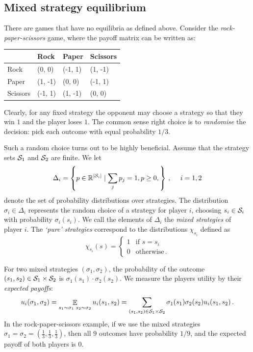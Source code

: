 \documentclass[12pt, showidx, twoside]{article}
\begin{document}
{{{\subsection{Mixed strategy equilibrium}
There are games that have no equilibria as defined above. Consider the \emph{rock-paper-scissors} game, where the payoff matrix can be written as:
\begin{center}
\begin{tabular}{l|l|l|l|}
 & Rock & Paper & Scissors\\ \hline
Rock & (\phantom{-}0, \phantom{-}0) & (-1, \phantom{-}1) & (\phantom{-}1, -1)\\ \hline
Paper & (\phantom{-}1, -1) & (\phantom{-}0, \phantom{-}0) & (-1, \phantom{-}1)\\ \hline
Scissors & (-1, \phantom{-}1) & (\phantom{-}1, -1) & (\phantom{-}0, \phantom{-}0)\\
\hline
\end{tabular}
\end{center}
Clearly, for any fixed strategy the opponent may choose a strategy so that they win $1$ and the player loses $1$. The common sense right choice is to \emph{randomise} the decision: pick each outcome with equal probability $1/3$.

Such a random choice turns out to be highly beneficial. Assume that the strategy sets ${\cal S}_1$ and ${\cal S}_2$ are finite. We let 
\[
    \Delta_i=\left\{p\in \mathbb{R}^{|{\cal S}_i|}\mid \sum_{j} p_j=1, p\ge 0,\right\}\, , \quad\ i=1,2
\]
denote the set of probability distributions over strategies. The distribution $\sigma_i\in \Delta_i$ represents the random choice of a strategy for player $i$, choosing $s_i\in {\cal S}_i$ with probability $\sigma_i(s_i)$. We call the elements of $\Delta_i$ the \emph{mixed strategies} of player $i$. The \emph{`pure' strategies} correspond to the distributions $\chi_{s_i}$ defined as
\[
\chi_{s_i}(s)=\begin{cases} 
1&\mbox{if }s=s_i\\
0&\mbox{otherwise}\, .
\end{cases}
\]

For two mixed strategies $(\sigma_1,\sigma_2)$, the probability of the outcome $(s_1,s_2)\in{\cal S}_1\times {\cal S}_2$ is $\sigma_1(s_1)\cdot\sigma_2(s_2)$.
We measure the players utility by their \emph{expected payoffs}:
\[
    u_i(\sigma_1,\sigma_2)=\mathop{\mathbb{E}}_{s_1\sim\sigma_1\,\, s_2\sim\sigma_2} u_i(s_1,s_2) =\sum_{(s_1,s_2)\in{\cal S}_1\times{\cal S}_2} \sigma_1(s_1)\sigma_2(s_2)u_i(s_1,s_2)\, .
\]
In the rock-paper-scissors example, if we use the mixed strategies $\sigma_1=\sigma_2=\left(\frac{1}{3},\frac{1}{3},\frac{1}{3}\right)$, then all 9 outcomes have probability $1/9$, and the expected payoff of both players is 0.

}}}
\end{document}
